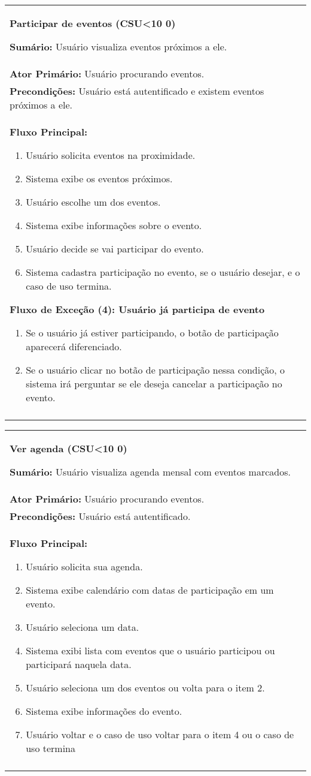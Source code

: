 \documentclass{article}
\newcounter{cscounter}
\newcommand{\sumario}[1] {\textbf{Sumário:} #1\\ }
\newcommand{\ator}[1] {\textbf{Ator Primário:} #1\\}
\newcommand{\precond}[1] {\textbf{Precondições:} #1\\}
\newcommand{\fluxo}{\textbf{Fluxo Principal:}}
\newenvironment{fluxoe}[2]
	{
		\textbf{Fluxo de Exceção (#1): #2}
		\begin{enumerate}[itemsep=0mm, label=(\alph*)]			
	}
	{
		\end{enumerate}			
	}
\newenvironment{casosdeuso}[1]
{
 \stepcounter{cscounter}
 \begin{center}
 \begin{tabular}{|p{\textwidth}|}
 \hline
 \begin{center}
 \large \textbf{#1 (CSU\ifnum\value{cscounter}<10 0\fi\arabic{cscounter})}
 \end{center}
}
{ 
 \\\\\hline
 \end{tabular} 
 \end{center}
}
\begin{document}
\begin{casosdeuso}{Participar de  eventos}
 \sumario{Usuário visualiza eventos próximos a ele.}
 \ator{Usuário procurando eventos.}
 \precond{Usuário está autentificado e existem eventos próximos a ele.}
\fluxo
\begin{enumerate}[itemsep=0mm]
 \item Usuário solicita eventos na proximidade.
 \item Sistema exibe os eventos próximos.
 \item Usuário escolhe um dos eventos.
 \item Sistema exibe informações sobre o evento.
 \item Usuário decide se vai participar do evento.
 \item Sistema cadastra participação no evento, se o usuário desejar, e o caso de uso termina.
 \end{enumerate}
 \begin{fluxoe}{4}{Usuário já participa de evento}
 \item Se o usuário já estiver participando, o botão de participação aparecerá diferenciado.
 \item Se o usuário clicar no botão de participação nessa condição, o sistema irá perguntar se ele deseja cancelar a participação no evento.
 \end{fluxoe} 
\end{casosdeuso}

\begin{casosdeuso}{Ver agenda}
 \sumario{Usuário visualiza agenda mensal com eventos marcados.}
 \ator{Usuário procurando eventos.}
 \precond{Usuário está autentificado.}
 \fluxo
\begin{enumerate}[itemsep=0mm]
 \item Usuário solicita sua agenda.
 \item Sistema exibe calendário com datas de participação em um evento.
 \item Usuário seleciona um data.
 \item Sistema exibi lista com eventos que o usuário participou ou participará naquela data.
 \item Usuário seleciona um dos eventos ou volta para o item 2.
 \item Sistema exibe informações do evento.
 \item Usuário voltar e o caso de uso voltar para o item 4 ou o caso de uso termina
\end{enumerate}
\end{casosdeuso}
\end{document}
